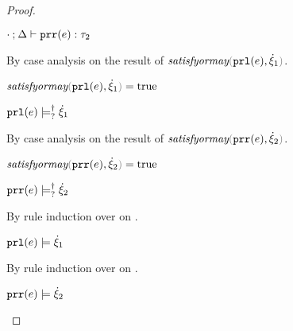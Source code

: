 \begin{proof}
\begin{byCases}
\begin{byCases}
\begin{pfsteps*}
      \item $\cdot \mathbin{;} \Delta \vdash \mathtt{prr}(e) : \tau_2$  
      \end{pfsteps*}
      By case analysis on the result of $\fsatisfyormay{\hprl{e}}{\hxi_1}$.
      \begin{byCases}
        \item[\true]
        \begin{pfsteps*}
        \item $\fsatisfyormay{\hprl{e}}{\hxi_1}=\true$  
        \item $\mathtt{prl}(e) \models_{?}^{\dag} \dot{\xi}_1$  
        \end{pfsteps*} 
        By case analysis on the result of $\fsatisfyormay{\hprr{e}}{\hxi_2}$.
        \begin{byCases}
          \item[\true]
          \begin{pfsteps*}
          \item $\fsatisfyormay{\hprr{e}}{\hxi_2}=\true$  
          \item $\mathtt{prr}(e) \models_{?}^{\dag} \dot{\xi}_2$  
          \end{pfsteps*}  
          By rule induction over  on .
          \begin{byCases}
            \item[\text{(\ref{rule:CSMSSat})}]
            \begin{pfsteps*}
            \item $\mathtt{prl}(e) \models \dot{\xi}_1$  
            \end{pfsteps*} 
            By rule induction over  on .
            \begin{byCases}
              \item[\text{(\ref{rule:CSMSSat})}]
              \begin{pfsteps*}
              \item $\mathtt{prr}(e) \models \dot{\xi}_2$  

\end{pfsteps*}
\end{byCases}
\end{byCases}
\end{byCases}
\end{byCases}
\end{byCases}
\end{byCases}
\end{proof}

